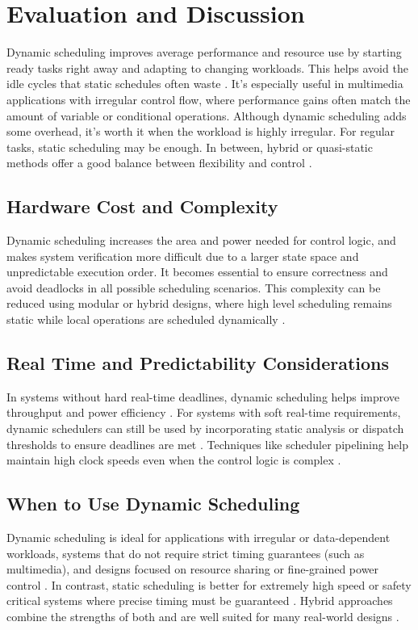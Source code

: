 \documentclass[conference]{IEEEtran}
\begin{document}
\section{Evaluation and Discussion}
Dynamic scheduling improves average performance and resource use by starting ready tasks right away and adapting to changing workloads. This helps avoid the idle cycles that static schedules often waste \cite{Scheffer2016}. It’s especially useful in multimedia applications with irregular control flow, where performance gains often match the amount of variable or conditional operations. Although dynamic scheduling adds some overhead, it’s worth it when the workload is highly irregular. For regular tasks, static scheduling may be enough. In between, hybrid or quasi-static methods offer a good balance between flexibility and control \cite{Scheffer2016}.

\subsection{Hardware Cost and Complexity}
Dynamic scheduling increases the area and power needed for control logic, and makes system verification more difficult due to a larger state space and unpredictable execution order. It becomes essential to ensure correctness and avoid deadlocks in all possible scheduling scenarios. This complexity can be reduced using modular or hybrid designs, where high level scheduling remains static while local operations are scheduled dynamically \cite{Ha2017}.

\subsection{Real Time and Predictability Considerations}
In systems without hard real-time deadlines, dynamic scheduling helps improve throughput and power efficiency \cite{Ha2017,Rettberg2006}. For systems with soft real-time requirements, dynamic schedulers can still be used by incorporating static analysis or dispatch thresholds to ensure deadlines are met \cite{Ha2017,Scheffer2016}. Techniques like scheduler pipelining help maintain high clock speeds even when the control logic is complex \cite{DeMicheli1994}.


\subsection{When to Use Dynamic Scheduling}
Dynamic scheduling is ideal for applications with irregular or data-dependent workloads, systems that do not require strict timing guarantees (such as multimedia), and designs focused on resource sharing or fine-grained power control \cite{Ha2017,Scheffer2016,Rettberg2006}. In contrast, static scheduling is better for extremely high speed or safety critical systems where precise timing must be guaranteed \cite{Ha2017}. Hybrid approaches combine the strengths of both and are well suited for many real-world designs \cite{Scheffer2016,Ha2017}.
\end{document}
